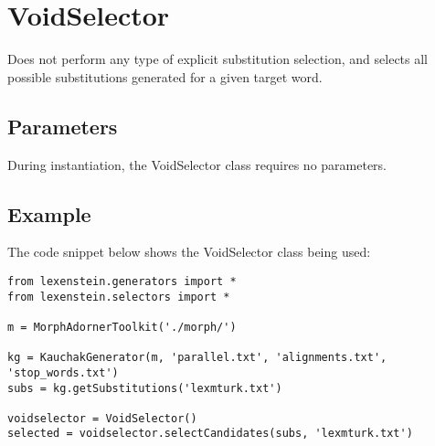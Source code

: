 \section{VoidSelector}

Does not perform any type of explicit substitution selection, and selects all possible substitutions generated for a given target word.

\subsection{Parameters}

During instantiation, the VoidSelector class requires no parameters.

\subsection{Example}

The code snippet below shows the VoidSelector class being used:

\begin{lstlisting}
from lexenstein.generators import *
from lexenstein.selectors import *

m = MorphAdornerToolkit('./morph/')

kg = KauchakGenerator(m, 'parallel.txt', 'alignments.txt', 'stop_words.txt')
subs = kg.getSubstitutions('lexmturk.txt')

voidselector = VoidSelector()
selected = voidselector.selectCandidates(subs, 'lexmturk.txt')
\end{lstlisting}